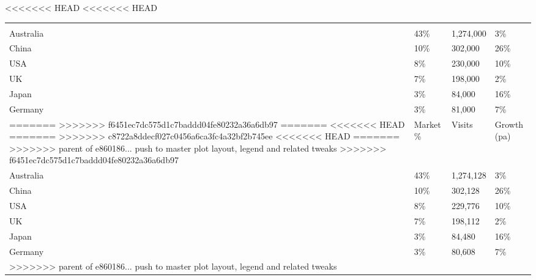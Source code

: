 <<<<<<< HEAD
<<<<<<< HEAD
\begin{tabular}[t]{p{3cm}>{\hfill}p{1.3cm}>{\hfill}p{1.1cm}>{\hfill}p{1.7cm}}
      &   &     &    \\ 
 Australia & 43\% & 1,274,000 & 3\% \\ 
  China & 10\% &   302,000 & 26\% \\ 
  USA & 8\% &   230,000 & 10\% \\ 
  UK & 7\% &   198,000 & 2\% \\ 
  Japan & 3\% &    84,000 & 16\% \\ 
  Germany & 3\% &    81,000 & 7\% \\ 
=======
>>>>>>> f6451ec7dc575d1c7baddd04fe80232a36a6db97
=======
<<<<<<< HEAD
=======
>>>>>>> c8722a8ddecf027c0456a6ca3fc4a32bf2b745ee
<<<<<<< HEAD
=======
>>>>>>> parent of e860186... push to master plot layout, legend and related tweaks
>>>>>>> f6451ec7dc575d1c7baddd04fe80232a36a6db97
\begin{tabular}[t]{p{3.3cm}>{\hfill}p{1.1cm}>{\hfill}p{1.3cm}>{\hfill}p{1.4cm}}
 Key international markets & Market \% & Visits & Growth (pa) \\ 
 Australia & 43\% & 1,274,128 & 3\% \\ 
  China & 10\% &   302,128 & 26\% \\ 
  USA & 8\% &   229,776 & 10\% \\ 
  UK & 7\% &   198,112 & 2\% \\ 
  Japan & 3\% &    84,480 & 16\% \\ 
  Germany & 3\% &    80,608 & 7\% \\ 
>>>>>>> parent of e860186... push to master plot layout, legend and related tweaks
  \end{tabular}
